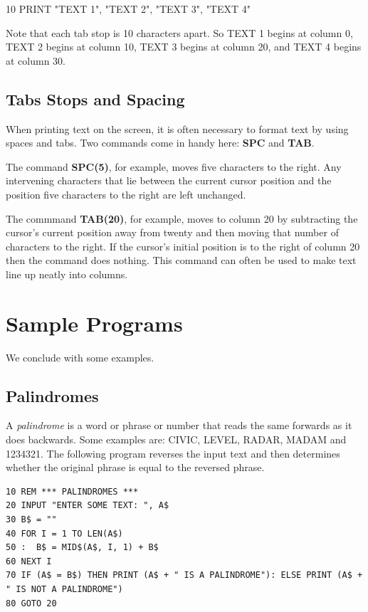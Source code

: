 \begin{screenoutput}
10 PRINT "TEXT 1", "TEXT 2", "TEXT 3", "TEXT 4"
\end{screenoutput}

Note that each tab stop is 10 characters apart. So TEXT 1 begins at column 0, TEXT 2 begins at column 10, TEXT 3 begins at column 20, and TEXT 4 begins at column 30.

\subsection{Tabs Stops and Spacing}
When printing text on the screen, it is often necessary to format text by using spaces and tabs. Two commands come in handy here: {\bf SPC} and {\bf TAB}.

The command {\bf SPC(5)}, for example, moves five characters to the right. Any intervening characters that lie between the current cursor position and the position five characters to the right are left unchanged.

The commmand {\bf TAB(20)}, for example, moves to column 20 by subtracting the cursor's current position away from twenty and then moving that number of characters to the right. If the cursor's initial position is to the right of column 20 then the command does nothing. This command can often be used to make text line up neatly into columns.

\section{Sample Programs}

We conclude with some examples.

\subsection{Palindromes}

A {\it palindrome} is a word or phrase or number that reads the same forwards as it does backwards. Some examples are: CIVIC, LEVEL, RADAR, MADAM and 1234321. The following program reverses the input text and then determines whether the original phrase is equal to the reversed phrase.

\begin{tcolorbox}[colback=black,coltext=white]
\verbatimfont{\codefont}
\begin{verbatim}
10 REM *** PALINDROMES ***
20 INPUT "ENTER SOME TEXT: ", A$
30 B$ = ""
40 FOR I = 1 TO LEN(A$)
50 :  B$ = MID$(A$, I, 1) + B$
60 NEXT I
70 IF (A$ = B$) THEN PRINT (A$ + " IS A PALINDROME"): ELSE PRINT (A$ + " IS NOT A PALINDROME")
80 GOTO 20
\end{verbatim}
\end{tcolorbox}


